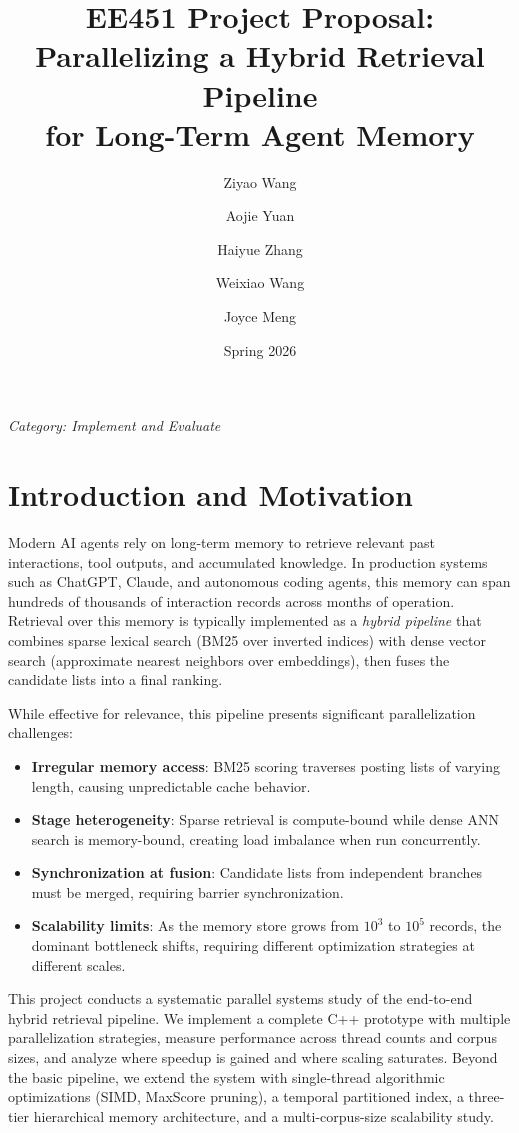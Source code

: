 \documentclass[11pt]{article}
\title{\textbf{EE451 Project Proposal:\\Parallelizing a Hybrid Retrieval Pipeline\\for Long-Term Agent Memory}}
\author{
    Ziyao Wang \and Aojie Yuan \and Haiyue Zhang \and Weixiao Wang \and Joyce Meng
}
\date{Spring 2026}
\begin{document}
\maketitle

\begin{center}
\textit{Category: Implement and Evaluate}
\end{center}

\section{Introduction and Motivation}

Modern AI agents rely on long-term memory to retrieve relevant past interactions, tool outputs, and accumulated knowledge. In production systems such as ChatGPT, Claude, and autonomous coding agents, this memory can span hundreds of thousands of interaction records across months of operation. Retrieval over this memory is typically implemented as a \textit{hybrid pipeline} that combines sparse lexical search (BM25 over inverted indices) with dense vector search (approximate nearest neighbors over embeddings), then fuses the candidate lists into a final ranking.

While effective for relevance, this pipeline presents significant parallelization challenges:
\begin{itemize}[nosep]
    \item \textbf{Irregular memory access}: BM25 scoring traverses posting lists of varying length, causing unpredictable cache behavior.
    \item \textbf{Stage heterogeneity}: Sparse retrieval is compute-bound while dense ANN search is memory-bound, creating load imbalance when run concurrently.
    \item \textbf{Synchronization at fusion}: Candidate lists from independent branches must be merged, requiring barrier synchronization.
    \item \textbf{Scalability limits}: As the memory store grows from $10^3$ to $10^5$ records, the dominant bottleneck shifts, requiring different optimization strategies at different scales.
\end{itemize}

This project conducts a systematic parallel systems study of the end-to-end hybrid retrieval pipeline. We implement a complete C++ prototype with multiple parallelization strategies, measure performance across thread counts and corpus sizes, and analyze where speedup is gained and where scaling saturates. Beyond the basic pipeline, we extend the system with single-thread algorithmic optimizations (SIMD, MaxScore pruning), a temporal partitioned index, a three-tier hierarchical memory architecture, and a multi-corpus-size scalability study.
\end{document}
